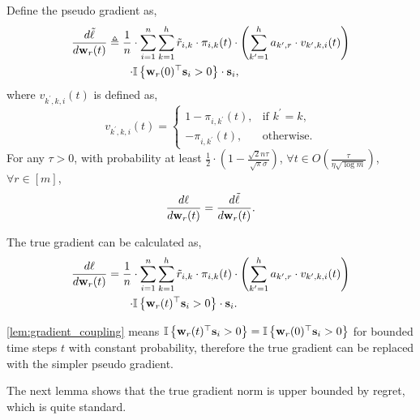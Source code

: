 \begin{lem}
\label{lem:gradient_coupling}
	Define the pseudo gradient as,
\begin{equation*}
\begin{split}
	\frac{d \tilde{\ell}}{d {\mathbf{w}}_r(t)} &\triangleq \frac{1}{n} \cdot \sum\limits_{i=1}^{n}{ \sum\limits_{k=1}^{h}{ \tilde{r}_{i,k} \cdot \pi_{i,k}(t) \cdot \left( \sum\limits_{k^\prime = 1}^{h}{ a_{k^\prime,r}  \cdot v_{k^\prime,k,i}(t) } \right) } } \\
	&\qquad { { \cdot {\mathbb{I}}\left\{ {\mathbf{w}}_r(0)^\top {\mathbf{s}}_i > 0 \right\} \cdot {\mathbf{s}}_i } },
\end{split}
\end{equation*}
where $v_{k^\prime,k,i}(t)$ is defined as,
\begin{equation*}
	v_{k^\prime,k,i}(t) = \begin{cases}
    1 - \pi_{i,k^\prime}(t), & \text{if $k^\prime = k$}, \\
    - \pi_{i,k^\prime}(t), & \text{otherwise}.
  \end{cases}
\end{equation*}
	For any $\tau > 0$, with probability at least $\frac{1}{2} \cdot \left( 1 - \frac{\sqrt{2}n\tau}{\sqrt{\pi}\sigma} \right)$, $\forall t \in O\left(\frac{\tau}{\eta  \sqrt{\log{m}}}\right)$, $\forall r \in [m]$,
\begin{equation}
	\frac{d\ell}{d {\mathbf{w}}_r(t)} = \frac{d \tilde{\ell}}{d {\mathbf{w}}_r(t)}.
\end{equation}
\end{lem}

The true gradient can be calculated as,
\begin{equation*}
\begin{split}
    \frac{d\ell}{d {\mathbf{w}}_r(t)} &= \frac{1}{n} \cdot \sum\limits_{i=1}^{n}{ \sum\limits_{k=1}^{h}{  \tilde{r}_{i,k} \cdot \pi_{i,k}(t) \cdot \left( \sum\limits_{k^\prime = 1}^{h}{ a_{k^\prime,r}  \cdot v_{k^\prime,k,i}(t) } \right) }} \\
    &\qquad  {{ \cdot {\mathbb{I}}\left\{ {\mathbf{w}}_r(t)^\top {\mathbf{s}}_i > 0 \right\} \cdot {\mathbf{s}}_i } }.
\end{split}
\end{equation*}

\cref{lem:gradient_coupling} means ${\mathbb{I}}\left\{ {\mathbf{w}}_r(t)^\top {\mathbf{s}}_i > 0 \right\} = {\mathbb{I}}\left\{ {\mathbf{w}}_r(0)^\top {\mathbf{s}}_i > 0 \right\} $ for bounded time steps $t$ with constant probability, therefore the true gradient can be replaced with the simpler pseudo gradient.

The next lemma shows that the true gradient norm is upper bounded by regret, which is quite standard.

